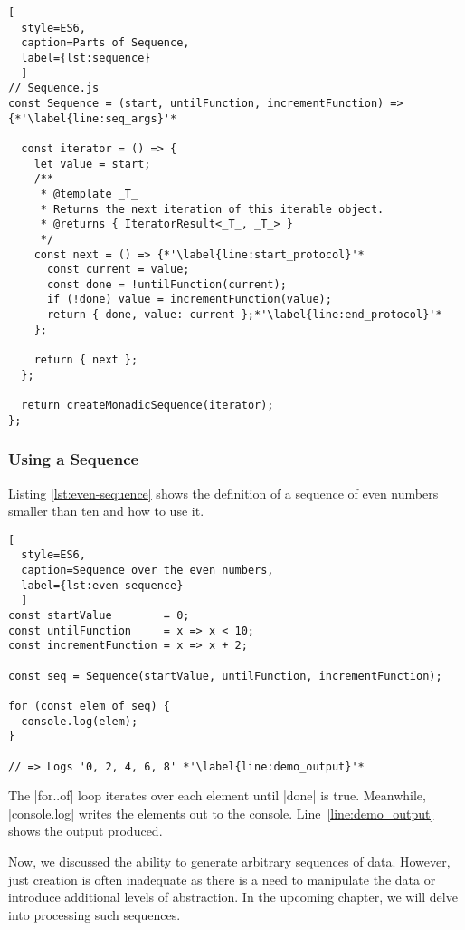 \begin{lstlisting}[
  style=ES6, 
  caption=Parts of Sequence,
  label={lst:sequence}
  ]
// Sequence.js
const Sequence = (start, untilFunction, incrementFunction) => {*'\label{line:seq_args}'*

  const iterator = () => {
    let value = start;
    /**
     * @template _T_
     * Returns the next iteration of this iterable object.
     * @returns { IteratorResult<_T_, _T_> }
     */
    const next = () => {*'\label{line:start_protocol}'*
      const current = value;
      const done = !untilFunction(current);
      if (!done) value = incrementFunction(value);
      return { done, value: current };*'\label{line:end_protocol}'*
    };

    return { next };
  };

  return createMonadicSequence(iterator);
};
\end{lstlisting}


\subsubsection{Using a Sequence}
\label{subsub:Using a Sequence}
Listing \ref{lst:even-sequence} shows the definition of a sequence of even 
numbers smaller than ten and how to use it. 
\begin{lstlisting}[
  style=ES6, 
  caption=Sequence over the even numbers,
  label={lst:even-sequence}
  ]
const startValue        = 0;
const untilFunction     = x => x < 10;
const incrementFunction = x => x + 2;

const seq = Sequence(startValue, untilFunction, incrementFunction);

for (const elem of seq) {
  console.log(elem);
}

// => Logs '0, 2, 4, 6, 8' *'\label{line:demo_output}'*
\end{lstlisting}

The |for..of| loop iterates over each
element until |done| is true. Meanwhile, |console.log| writes the elements out 
to the console. Line~\ref{line:demo_output} shows the output produced.
\newline

Now, we discussed the ability to generate arbitrary sequences of data. However, 
just creation is often inadequate as there is a need to manipulate the data or 
introduce additional levels of abstraction. In the upcoming chapter, we will 
delve into processing such sequences.
